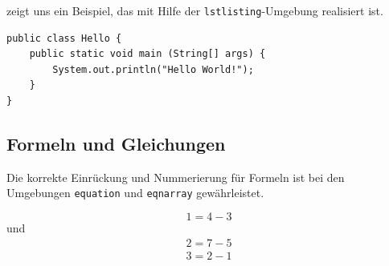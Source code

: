 \documentclass[utf8,biblatex]{lni}
\begin{document}
 zeigt uns ein Beispiel, das mit Hilfe der \texttt{lstlisting}-Umgebung realisiert ist.

\begin{lstlisting}[caption={Beschreibung}, label=L1]
public class Hello {
    public static void main (String[] args) {
        System.out.println("Hello World!");
    }
}
\end{lstlisting}

\subsection{Formeln und Gleichungen}

Die korrekte Einrückung und Nummerierung für Formeln ist bei den Umgebungen \texttt{equation} und \texttt{eqnarray} gewährleistet.

\begin{equation}
  1=4-3
\end{equation}
und
\begin{eqnarray}
  2=7-5\\
  3=2-1
\end{eqnarray}

\printbibliography
\end{document}
